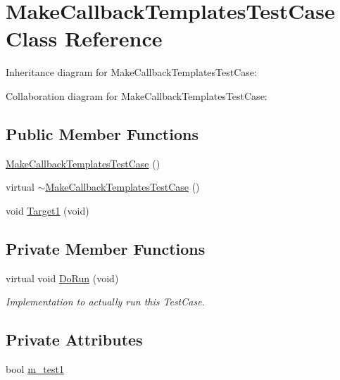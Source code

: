 \hypertarget{classMakeCallbackTemplatesTestCase}{}\section{Make\+Callback\+Templates\+Test\+Case Class Reference}
\label{classMakeCallbackTemplatesTestCase}


Inheritance diagram for Make\+Callback\+Templates\+Test\+Case\+:


Collaboration diagram for Make\+Callback\+Templates\+Test\+Case\+:
\subsection*{Public Member Functions}
\begin{DoxyCompactItemize}
\item 
\hyperlink{classMakeCallbackTemplatesTestCase_a0f8381d15645ff765b83f65109f17817}{Make\+Callback\+Templates\+Test\+Case} ()
\item 
virtual \hyperlink{classMakeCallbackTemplatesTestCase_a30f5158321239e387f3a772c31a688a7}{$\sim$\+Make\+Callback\+Templates\+Test\+Case} ()
\item 
void \hyperlink{classMakeCallbackTemplatesTestCase_ae36412d99973065222e9ef7cb75a68a8}{Target1} (void)
\end{DoxyCompactItemize}
\subsection*{Private Member Functions}
\begin{DoxyCompactItemize}
\item 
virtual void \hyperlink{classMakeCallbackTemplatesTestCase_ab576537ac7ffe4f5dd0a4ce2d0e66a57}{Do\+Run} (void)
\begin{DoxyCompactList}\small\item\em Implementation to actually run this Test\+Case. \end{DoxyCompactList}\end{DoxyCompactItemize}
\subsection*{Private Attributes}
\begin{DoxyCompactItemize}
\item 
bool \hyperlink{classMakeCallbackTemplatesTestCase_a30115f5d278393bbf6512095fb307ead}{m\+\_\+test1}
\end{DoxyCompactItemize}
